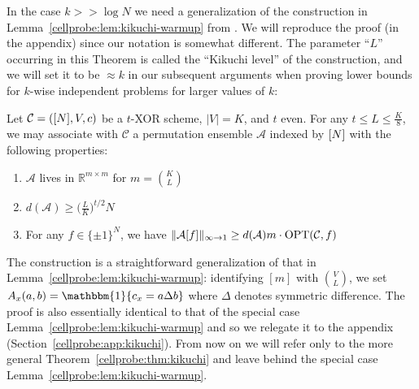 In the case $k >> \log N$ we need a generalization of the construction in Lemma~\ref{cellprobe:lem:kikuchi-warmup} from \cite{wein2019kikuchi,smoothed}. We will reproduce the proof (in the appendix) since our notation is somewhat different. The parameter ``$L$'' occurring in this Theorem is called the ``Kikuchi level'' of the construction, and we will set it to be $\approx k$ in our subsequent arguments when proving lower bounds for $k$-wise independent problems for larger values of $k$:
\begin{theorem}\label{cellprobe:thm:kikuchi}
Let $\mathcal{C} = ([N],V,c)$ be a $t$-XOR scheme, $|V|=K$, and $t$ even. For any $t \leq L \leq \frac{K}{8}$, we may associate with $\mathcal{C}$ a permutation ensemble
$\mathcal{A}$ indexed by $[N]$ with the following properties:
\begin{enumerate}
	\item $\mathcal{A}$ lives in $\mathbb{R}^{m \times m}$ for $m = \binom{K}{L}$
	\item $d(\mathcal{A}) \geq \bigl(\frac{L}{K}\bigr)^{t/2} N$
	\item For any $f\in \{\pm 1\}^N$, we have $\Vert \mathcal{A}[f] \Vert_{\infty \to 1} \geq d(\mathcal{A}) m \cdot \mathrm{OPT}(\mathcal{C},f)$
\end{enumerate}
\end{theorem}
The construction is a straightforward generalization of that in Lemma~\ref{cellprobe:lem:kikuchi-warmup}: identifying $[m]$ with $\binom{V}{L}$, we set $A_x(a,b) = \mathbbm{1}\{ c_x = a \Delta b\}$ where $\Delta$ denotes symmetric difference. The proof is also essentially identical to that of the special case Lemma~\ref{cellprobe:lem:kikuchi-warmup} and so we relegate it to the appendix (Section~\ref{cellprobe:app:kikuchi}). From now on we will refer only to the more general Theorem~\ref{cellprobe:thm:kikuchi} and leave behind the special case Lemma~\ref{cellprobe:lem:kikuchi-warmup}.

